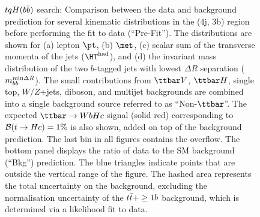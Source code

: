 \begin{figure}[htbp]
\begin{center}
\caption{\small{$tqH(b\bar{b})$ search: Comparison between the data and background prediction for several kinematic 
distributions in the (4j, 3b) region before performing the fit to data (``Pre-Fit''). 
The distributions are shown for (a) lepton $\pt$, (b) $\met$, (c) scalar sum of the transverse momenta of 
the jets ($\hthad$), and (d) the invariant mass distribution of the two $b$-tagged jets with lowest 
$\Delta R$ separation ($m_{bb}^{\textrm{min}\Delta R}$).
The small contributions from $\ttbar V$, $\ttbar H$, single top, $W/Z$+jets, diboson, and multijet backgrounds are combined 
into a single background source referred to as ``Non-$\ttbar$''. 
The expected $\Hc$ signal (solid red) corresponding to $\mathcal{B}(t\to Hc)=1\%$ is also shown,
added on top of the background prediction.
The last bin in all figures contains the overflow.
The bottom panel displays the ratio of data to the SM background (``Bkg'') prediction. 
The blue triangles indicate points that are outside the vertical range of the figure. 
The hashed area represents the total uncertainty on the background, excluding the normalisation uncertainty of the $t\bar{t}+\geq1b$ background, 
which is determined via a likelihood fit to data.}}
\label{fig:Hbb_extravars_4j3b}
\end{center}
\end{figure}

